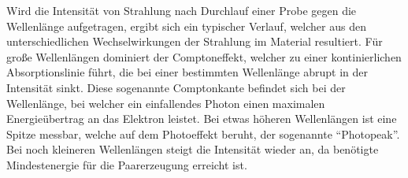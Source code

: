 Wird die Intensität von Strahlung nach Durchlauf einer Probe gegen die Wellenlänge
aufgetragen, ergibt sich ein typischer Verlauf, welcher aus den unterschiedlichen
Wechselwirkungen der Strahlung im Material resultiert.
Für große Wellenlängen dominiert der Comptoneffekt,
welcher zu einer kontinierlichen Absorptionslinie führt,
die bei einer bestimmten Wellenlänge abrupt in der Intensität sinkt.
Diese sogenannte Comptonkante befindet sich bei der Wellenlänge,
bei welcher ein einfallendes Photon einen maximalen
Energieübertrag an das Elektron leistet.
Bei etwas höheren Wellenlängen ist eine Spitze messbar,
welche auf dem Photoeffekt beruht, der sogenannte \enquote{Photopeak}.
Bei noch kleineren Wellenlängen steigt die Intensität wieder an,
da benötigte Mindestenergie für die Paarerzeugung erreicht ist.

